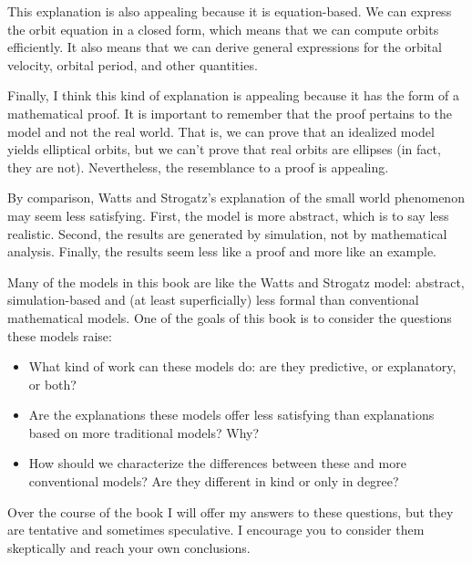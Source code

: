 \documentclass[12pt]{book}
\theoremstyle{exercise}
\begin{document}

This explanation is also appealing because it is equation-based.
We can express the orbit equation in a closed form, which means
that we can compute orbits efficiently.  It also means that
we can derive general expressions for the orbital velocity,
orbital period, and other quantities.


Finally, I think this kind of explanation is appealing because
it has the form of a mathematical proof.
It is important to remember that the proof pertains to the
model and not the real world.
That is, we can prove that
an idealized model yields elliptical orbits, but
we can't prove that real orbits are ellipses (in
fact, they are not).
Nevertheless, the resemblance to a proof is appealing.


By comparison, Watts and Strogatz's explanation of the small
world phenomenon may seem less satisfying.  First, the model
is more abstract, which is to say less realistic.  Second,
the results are generated by simulation, not by mathematical
analysis.  Finally, the results seem less like a proof and
more like an example.


Many of the models in this book are like the Watts and Strogatz model:
abstract, simulation-based and (at least superficially) less formal
than conventional mathematical models.  One of the goals of this book
is to consider the questions these models raise:


\begin{itemize}

\item What kind of work can these models do: are they predictive, or
  explanatory, or both?

\item Are the explanations these models offer less satisfying than
  explanations based on more traditional models?  Why?

\item How should we characterize the differences between these and
  more conventional models?  Are they different in kind or only in
  degree?

\end{itemize}

Over the course of the book I will offer my answers
to these questions, but they are tentative and sometimes
speculative.  I encourage you to consider them skeptically
and reach your own conclusions.
\end{document}
